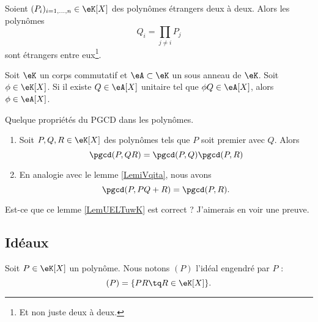 \begin{lemma}       \label{LemuALZHn}
    Soient \( (P_i)_{i=1,\ldots,n}\in \eK[X]\) des polynômes étrangers deux à deux. Alors les polynômes \begin{equation} Q_i=\prod_{j\neq i}P_j \end{equation}
    sont étrangers entre eux\footnote{Et non juste deux à deux.}.
\end{lemma}

\begin{lemma}   \label{LemzwkYdn}
    Soit \( \eK\) un corps commutatif et \( \eA\subset \eK\) un sous anneau de \( \eK\). Soit \( \phi\in \eK[X]\). Si il existe \( Q\in \eA[X]\) unitaire tel que \( \phi Q\in \eA[X]\), alors \( \phi\in \eA[X]\).
\end{lemma}

\begin{lemma}   \label{LemUELTuwK}
    Quelque propriétés du PGCD dans les polynômes.
    \begin{enumerate}
        \item
            Soit \( P,Q,R\in \eK[X]\) des polynômes tels que \( P\) soit premier avec \( Q\). Alors
            \begin{equation}
                \pgcd(P,QR)=\pgcd(P,Q)\pgcd(P,R)
            \end{equation}
        \item
            En analogie avec le lemme \ref{LemiVqita}, nous avons
            \begin{equation}
                \pgcd(P,PQ+R)=\pgcd(P,R).
            \end{equation}
    \end{enumerate}
\end{lemma}
\begin{probleme}
    Est-ce que ce lemme \ref{LemUELTuwK} est correct ? J'aimerais en voir une preuve.
\end{probleme}

\subsection{Idéaux}

Soit \( P\in \eK[X]\) un polynôme. Nous notons \( (P)\) l'idéal engendré par \( P\) :
\begin{equation}        \label{EqDefxMkDtW}
    (P)=\{ PR\tq R\in\eK[X] \}.
\end{equation}

